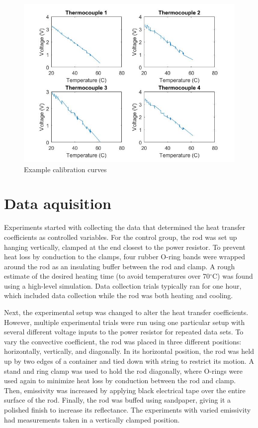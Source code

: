 \documentclass[letterpaper,titlepage,oneside]{report}
\begin{document}
\begin{figure}[ht]
  \centering
  \includegraphics[width=.75\textwidth]{calib}
  \caption{Example calibration curves}
  \label{fig:calib}
\end{figure}

\section{Data aquisition}
Experiments started with collecting the data that determined the
heat transfer coefficients as controlled variables. For the
control group, the rod was set up hanging vertically, clamped
at the end closest to the power resistor. To prevent heat loss
by conduction to the clamps, four rubber O-ring bands were
wrapped around the rod as an insulating buffer between the rod and
clamp. A rough estimate of the desired heating time (to avoid
temperatures over 70$^{\circ}$C) was found using a high-level
simulation. Data collection trials typically ran for one hour,
which included data collection while the rod was both heating and
cooling.


Next, the experimental setup was changed to alter the heat transfer
coefficients. However, multiple experimental trials were run
using one particular setup with several different voltage inputs
to the power resistor for repeated data sets. To vary the
convective coefficient, the rod was placed in three different
positions: horizontally, vertically, and diagonally. In its
horizontal position, the rod was held up by two edges of
a container and tied down with string to restrict its motion.
A stand and ring clamp was used to hold the rod diagonally,
where O-rings were used again to minimize heat loss by
conduction between the rod and clamp. Then, emissivity was
increased by applying black electrical tape over the entire
surface of the rod. Finally, the rod was buffed using sandpaper,
giving it a polished finish to increase its reflectance.
The experiments with varied emissivity had measurements taken in
a vertically clamped position.
\end{document}
